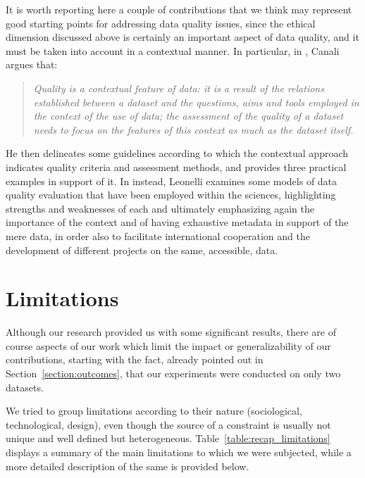 It is worth reporting here a couple of contributions that we think may represent good starting points for addressing data quality issues, since the ethical dimension discussed above is certainly an important aspect of data quality, and it must be taken into account in a contextual manner. In particular, in \cite{canali2020towards}, Canali argues that:
\begin{quote}\emph{Quality is a contextual feature of data: it is a result of the relations established between a dataset and the questions, aims and tools employed in the context of the use of data; the assessment of the quality of a dataset needs to focus on the features of this context as much as the dataset itself.} \cite[p.~4]{canali2020towards}\end{quote}
He then delineates some guidelines according to which the contextual approach indicates quality criteria and assessment methods, and provides three practical examples in support of it. In \cite{leonelli2017global} instead, Leonelli examines some models of data quality evaluation that have been employed within the sciences, highlighting strengths and weaknesses of each and ultimately emphasizing again the importance of the context and of having exhaustive metadata in support of the mere data, in order also to facilitate international cooperation and the development of different projects on the same, accessible, data.


\section{Limitations}
\label{section:limitations}
Although our research provided us with some significant results, there are of course aspects of our work which limit the impact or generalizability of our contributions, starting with the fact, already pointed out in Section~\ref{section:outcomes}, that our experiments were conducted on only two datasets.

We tried to group limitations according to their nature (sociological, technological, design), even though the source of a constraint is usually not unique and well defined but heterogeneous. Table~\ref{table:recap_limitations} displays a summary of the main limitations to which we were subjected, while a more detailed description of the same is provided below.

